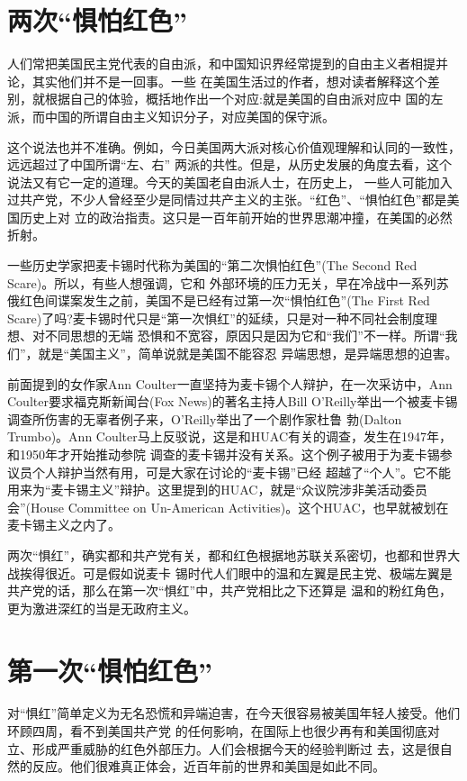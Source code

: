 \documentclass[10pt]{article}
\begin{document}
{\pagebreak
\section{两次``惧怕红色''}

人们常把美国民主党代表的自由派，和中国知识界经常提到的自由主义者相提并论，其实他们并不是一回事。一些
在美国生活过的作者，想对读者解释这个差别，就根据自己的体验，概括地作出一个对应:就是美国的自由派对应中
国的左派，而中国的所谓自由主义知识分子，对应美国的保守派。

这个说法也并不准确。例如，今日美国两大派对核心价值观理解和认同的一致性，远远超过了中国所谓``左、右''
两派的共性。但是，从历史发展的角度去看，这个说法又有它一定的道理。今天的美国老自由派人士，在历史上，
一些人可能加入过共产党，不少人曾经至少是同情过共产主义的主张。``红色''、``惧怕红色''都是美国历史上对
立的政治指责。这只是一百年前开始的世界思潮冲撞，在美国的必然折射。

一些历史学家把麦卡锡时代称为美国的``第二次惧怕红色''(The Second Red Scare)。所以，有些人想强调，它和
外部环境的压力无关，早在冷战中一系列苏俄红色间谍案发生之前，美国不是已经有过第一次``惧怕红色''(The
First Red Scare)了吗?麦卡锡时代只是``第一次惧红''的延续，只是对一种不同社会制度理想、对不同思想的无端
恐惧和不宽容，原因只是因为它和``我们''不一样。所谓``我们''，就是``美国主义''，简单说就是美国不能容忍
异端思想，是异端思想的迫害。

前面提到的女作家Ann Coulter一直坚持为麦卡锡个人辩护，在一次采访中，Ann Coulter要求福克斯新闻台(Fox
News)的著名主持人Bill O'Reilly举出一个被麦卡锡调查所伤害的无辜者例子来，O'Reilly举出了一个剧作家杜鲁
勃(Dalton Trumbo)。Ann Coulter马上反驳说，这是和HUAC有关的调查，发生在1947年，和1950年才开始推动参院
调查的麦卡锡并没有关系。这个例子被用于为麦卡锡参议员个人辩护当然有用，可是大家在讨论的``麦卡锡''已经
超越了``个人''。它不能用来为``麦卡锡主义''辩护。这里提到的HUAC，就是``众议院涉非美活动委员会''(House
Committee on Un-American Activities)。这个HUAC，也早就被划在麦卡锡主义之内了。

两次``惧红''，确实都和共产党有关，都和红色根据地苏联关系密切，也都和世界大战挨得很近。可是假如说麦卡
锡时代人们眼中的温和左翼是民主党、极端左翼是共产党的话，那么在第一次``惧红''中，共产党相比之下还算是
温和的粉红角色，更为激进深红的当是无政府主义。

\pagebreak
\section{第一次``惧怕红色''}

对``惧红''简单定义为无名恐慌和异端迫害，在今天很容易被美国年轻人接受。他们环顾四周，看不到美国共产党
的任何影响，在国际上也很少再有和美国彻底对立、形成严重威胁的红色外部压力。人们会根据今天的经验判断过
去，这是很自然的反应。他们很难真正体会，近百年前的世界和美国是如此不同。

}
\end{document}
